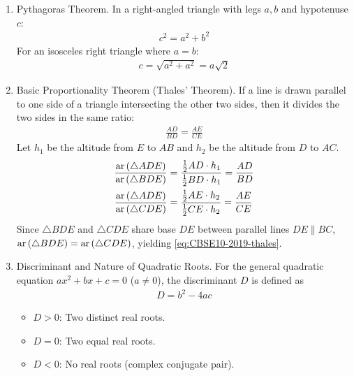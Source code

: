 \begin{enumerate}[label=\thesubsection.\arabic*, ref=\thesubsection.\theenumi]
	\item Pythagoras Theorem. In a right-angled triangle with legs $a, b$ and hypotenuse $c$:
	\begin{align}
		c^2 = a^2 + b^2 \label{eq:CBSE10-2019-pythagoras}
	\end{align}
	For an isosceles right triangle where $a = b$:
	\begin{align}
		c = \sqrt{a^2 + a^2} = a\sqrt{2} \label{eq:CBSE10-2019-isosceles_right}
	\end{align}
	
	\item Basic Proportionality Theorem (Thales' Theorem).
	If a line is drawn parallel to one side of a triangle intersecting the other two sides, then it divides the two sides in the same ratio:
	\begin{align}
		\frac{AD}{BD} = \frac{AE}{CE} \label{eq:CBSE10-2019-thales}
	\end{align}
	\solution
	Let $h_1$ be the altitude from $E$ to $AB$ and $h_2$ be the altitude from $D$ to $AC$.
	\begin{align}
		\frac{\text{ar}\left(\triangle ADE\right)}{\text{ar}\left(\triangle BDE\right)} &= \frac{\frac{1}{2}AD \cdot h_1}{\frac{1}{2}BD \cdot h_1} = \frac{AD}{BD} \\
		\frac{\text{ar}\left(\triangle ADE\right)}{\text{ar}\left(\triangle CDE\right)} &= \frac{\frac{1}{2}AE \cdot h_2}{\frac{1}{2}CE \cdot h_2} = \frac{AE}{CE}
	\end{align}
	Since $\triangle BDE$ and $\triangle CDE$ share base $DE$ between parallel lines $DE \parallel BC$, $\text{ar}\left(\triangle BDE\right) = \text{ar}\left(\triangle CDE\right)$, yielding \eqref{eq:CBSE10-2019-thales}.
	
	
	\item Discriminant and Nature of Quadratic Roots.
	For the general quadratic equation $ax^2 + bx + c = 0$ ($a \neq 0$), the discriminant $D$ is defined as
	\begin{align}
		D = b^2 - 4ac \label{eq:CBSE10-2019-discriminant}
	\end{align}
	\begin{itemize}
		\item $D > 0$: Two distinct real roots.
		\item $D = 0$: Two equal real roots.
		\item $D < 0$: No real roots (complex conjugate pair).
	\end{itemize}
	

\end{enumerate}
